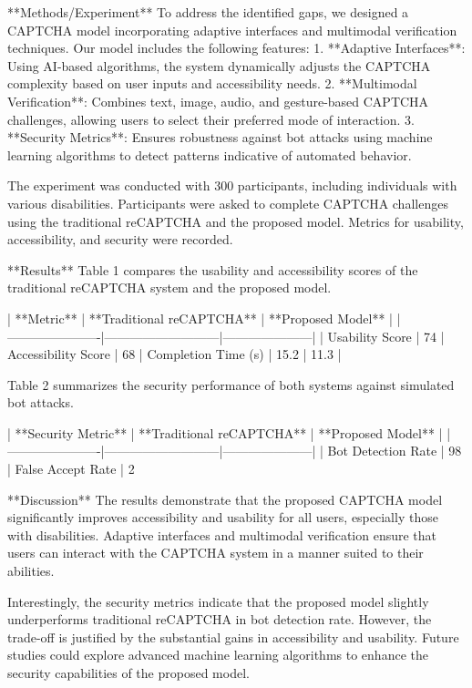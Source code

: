 **Methods/Experiment**  
To address the identified gaps, we designed a CAPTCHA model incorporating adaptive interfaces and multimodal verification techniques. Our model includes the following features:  
1. **Adaptive Interfaces**: Using AI-based algorithms, the system dynamically adjusts the CAPTCHA complexity based on user inputs and accessibility needs.  
2. **Multimodal Verification**: Combines text, image, audio, and gesture-based CAPTCHA challenges, allowing users to select their preferred mode of interaction.  
3. **Security Metrics**: Ensures robustness against bot attacks using machine learning algorithms to detect patterns indicative of automated behavior.  

The experiment was conducted with 300 participants, including individuals with various disabilities. Participants were asked to complete CAPTCHA challenges using the traditional reCAPTCHA and the proposed model. Metrics for usability, accessibility, and security were recorded.  

**Results**  
Table 1 compares the usability and accessibility scores of the traditional reCAPTCHA system and the proposed model.  

| **Metric**          | **Traditional reCAPTCHA** | **Proposed Model** |  
|----------------------|---------------------------|---------------------|  
| Usability Score      | 74%
| Accessibility Score  | 68%
| Completion Time (s)  | 15.2                      | 11.3                |  

Table 2 summarizes the security performance of both systems against simulated bot attacks.  

| **Security Metric**  | **Traditional reCAPTCHA** | **Proposed Model** |  
|----------------------|---------------------------|---------------------|  
| Bot Detection Rate   | 98%
| False Accept Rate    | 2%

**Discussion**  
The results demonstrate that the proposed CAPTCHA model significantly improves accessibility and usability for all users, especially those with disabilities. Adaptive interfaces and multimodal verification ensure that users can interact with the CAPTCHA system in a manner suited to their abilities.  

Interestingly, the security metrics indicate that the proposed model slightly underperforms traditional reCAPTCHA in bot detection rate. However, the trade-off is justified by the substantial gains in accessibility and usability. Future studies could explore advanced machine learning algorithms to enhance the security capabilities of the proposed model.  

